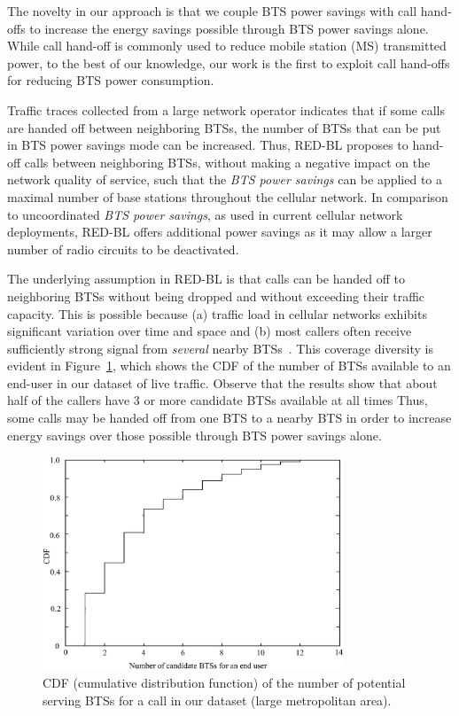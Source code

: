 The novelty in our approach is that we couple BTS power savings with call hand-offs to increase the
energy savings possible through BTS power savings alone. While call hand-off is commonly used to
reduce mobile station (MS) transmitted power, to the best of our knowledge, our work is the first to exploit call hand-offs for reducing BTS power consumption.

Traffic traces collected from a large network operator indicates that if some calls are handed off between
neighboring BTSs, the number of BTSs that can be put in BTS power savings mode can be increased.
Thus, RED-BL proposes to hand-off calls between neighboring BTSs, without making a negative
impact on the network quality of service, such that the \textit{BTS power savings} can be applied to a
maximal number of base stations throughout the cellular network. In comparison to uncoordinated \textit{BTS power savings}, as used in current cellular network deployments, RED-BL
offers additional power savings as it may allow a larger number of radio circuits to be deactivated.

The underlying assumption in RED-BL is that calls can be handed off to neighboring BTSs
without being dropped and without exceeding their traffic capacity. This is possible because (a) traffic load in cellular networks exhibits significant variation over time and space and (b)
most callers often receive sufficiently strong signal from \emph{several} nearby
BTSs~\cite{Peng:2011:BTSSaving:Mobicom,lowcarb:2013:globecom}.
This coverage diversity is evident in Figure~\ref{fig:btscdf}, which shows the CDF of the number of BTSs available to an end-user in our dataset of live traffic.
Observe that the results show that about half of the callers have 3 or more candidate BTSs available at all times
Thus, some calls may be handed off from one BTS to a nearby BTS in order to increase energy savings over those
possible through BTS power savings alone.
\begin{figure}[h!]
\centering
\includegraphics[width=0.8\textwidth]{pics/ilyas2.eps}
\caption{CDF (cumulative distribution function) of the number of potential serving BTSs for a call in our dataset (large metropolitan area).}
\label{fig:btscdf}
\end{figure}

